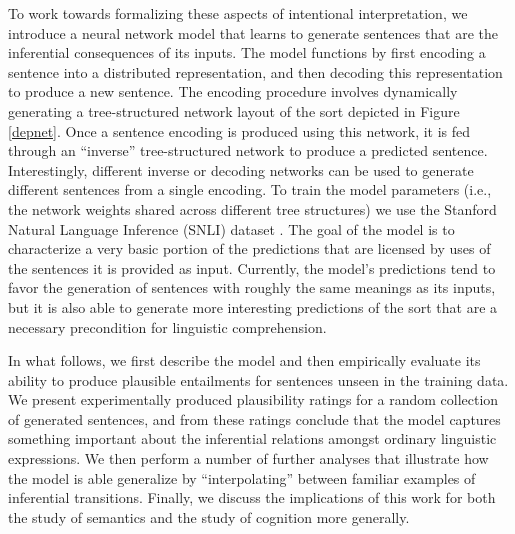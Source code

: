 \documentclass[utf8]{frontiersSCNS} %
\begin{document}
To work towards formalizing these aspects of intentional interpretation, we introduce a neural network model that learns to generate sentences that are the inferential consequences of its inputs. The model functions by first encoding a sentence into a distributed representation, and then decoding this representation to produce a new sentence. The encoding procedure involves dynamically generating a tree-structured network layout of the sort depicted in Figure \ref{depnet}. Once a sentence encoding is produced using this network, it is fed through an ``inverse'' tree-structured network to produce a predicted sentence. Interestingly, different inverse or decoding networks can be used to generate different sentences from a single encoding. To train the model parameters (i.e., the network weights shared across different tree structures) we use the Stanford Natural Language Inference (SNLI) dataset \citep{Bowman:2015}. The goal of the model is to characterize a very basic portion of the predictions that are licensed by uses of the sentences it is provided as input. Currently, the model's predictions tend to favor the generation of sentences with roughly the same meanings as its inputs, but it is also able to generate more interesting predictions of the sort that are a necessary precondition for linguistic comprehension.

In what follows, we first describe the model and then empirically evaluate its ability to produce plausible entailments for sentences unseen in the training data. We present experimentally produced plausibility ratings for a random collection of generated sentences, and from these ratings conclude that the model captures something important about the inferential relations amongst ordinary linguistic expressions. We then perform a number of further analyses that illustrate how the model is able generalize by ``interpolating'' between familiar examples of inferential transitions. Finally, we discuss the implications of this work for both the study of semantics and the study of cognition more generally.
\end{document}
